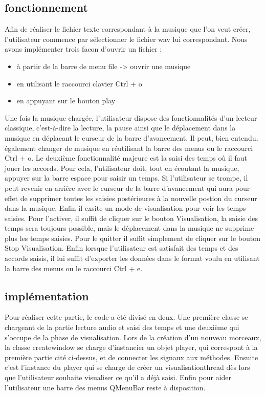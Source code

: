 \subsection{fonctionnement}
Afin de réaliser le fichier texte correspondant à la musique que l'on veut créer, l'utilisateur commence par sélectionner le fichier wav lui correspondant. Nous avons implémenter trois facon d'ouvrir un fichier :
\begin{itemize}
\item à partir de la barre de menu file -> ouvrir une musique
\item en utilisant le raccourci clavier Ctrl + o
\item en appuyant sur le bouton play
\end{itemize}
Une fois la musique chargée, l'utilisateur dispose des fonctionnalités d'un lecteur classique, c'est-à-dire la lecture, la pause ainsi que le déplacement dans la musique en déplacant le curseur de la barre d'avancement. Il peut, bien entendu, également changer de musique en réutilisant la barre des menus ou le raccourci Ctrl + o.
Le deuxième fonctionnalité majeure est la saisi des temps où il faut jouer les accords. Pour cela, l'utilisateur doit, tout en écoutant la musique, appuyer sur la barre espace pour saisir un temps. Si l'utilisateur se trompe, il peut revenir en arrière avec le curseur de la barre d'avancement qui aura pour effet de supprimer toutes les saisies postérieures à la nouvelle postion du curseur dans la musique.
Enfin il exsite un mode de visualisation pour voir les temps saisies. Pour l'activer, il suffit de cliquer sur le bouton Visualisation, la saisie des temps sera toujours possible, mais le déplacement dans la musique ne supprime plus les temps saisies. Pour le quitter il suffit simplement de cliquer sur le bouton Stop Visualisation.
Enfin lorsque l'utilisateur est satisfait des temps et des accords saisis, il lui suffit d'exporter les données dans le format voulu en utilisant la barre des menus ou le raccourci Ctrl + e.
\subsection{implémentation}
Pour réaliser cette partie, le code a été divisé en deux. Une première classe se chargeant de la partie lecture audio et saisi des temps et une deuxième qui s'occupe de la phase de visualisation.
Lors de la création d'un nouveau morceaux, la classe createwindow se charge d'instancier un objet player, qui correspont à la première partie cité ci-dessus, et de connecter les signaux aux méthodes. Ensuite c'est l'instance du player qui se charge de créer un visualisationthread dès lors que l'utilisateur souhaite visualiser ce qu'il a déjà saisi.
Enfin pour aider l'utilisateur une barre des menus QMenuBar reste à disposition.
